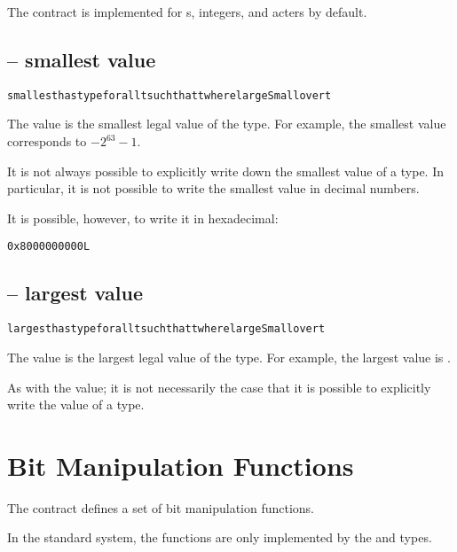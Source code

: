 The  contract is implemented for s,  integers,  and acters by default.

\subsection{ -- smallest value}
\begin{alltt}
smallest has type for all t such that t where largeSmall over t
\end{alltt}

The   value is the smallest legal value of the type. For example, the smallest  value corresponds to $-2^{63}-1$.

\begin{aside}
It is not always possible to explicitly write down the smallest value of a type. In particular, it is not possible to write the smallest  value in decimal numbers.
\begin{aside}
It is possible, however, to write it in hexadecimal:
\begin{alltt}
0x8000000000L
\end{alltt}
\end{aside}
\end{aside}

\subsection{ -- largest value}
\begin{alltt}
largest has type for all t such that t where largeSmall over t
\end{alltt}

The   value is the largest legal value of the type. For example, the largest  value is .

\begin{aside}
As with the  value; it is not necessarily the case that it is possible to explicitly write the  value of a type.
\end{aside}

\section{Bit Manipulation Functions}
\label{bitString}

The  contract defines a set of bit manipulation functions.

\begin{aside}
In the standard system, the  functions are only implemented by the  and  types.
\end{aside}

